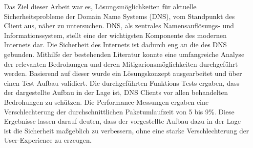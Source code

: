
Das Ziel dieser Arbeit war es, Lösungsmöglichkeiten für aktuelle Sicherheitsprobleme der Domain Name Systems (DNS), vom Standpunkt des Client aus, näher zu untersuchen. DNS, als zentrales Namensauflösungs- und Informationssystem, stellt eine der wichtigsten Komponente des modernen Internets dar. Die Sicherheit des Internets ist dadurch eng an die des DNS gebunden. Mithilfe der bestehenden Literatur konnte eine umfangreiche Analyse der relevanten Bedrohungen und deren Mitigarionsmöglichkeiten durchgeführt werden. Basierend auf dieser wurde ein Lösungskonzept ausgearbeitet und über einen Test-Aufbau validiert. Die durchgeführten Funktions-Tests ergaben, dass der dargestellte Aufbau in der Lage ist, DNS Clients vor allen behandelten Bedrohungen zu schützen. Die Performance-Messungen ergaben eine Verschlechterung der durchschnittlichen Paketumlaufzeit von 5 bis 9\%. Diese Ergebnisse lassen darauf deuten, dass der vorgestellte Aufbau dazu in der Lage ist die Sicherheit maßgeblich zu verbessern, ohne eine starke Verschlechterung der User-Experience zu erzeugen.